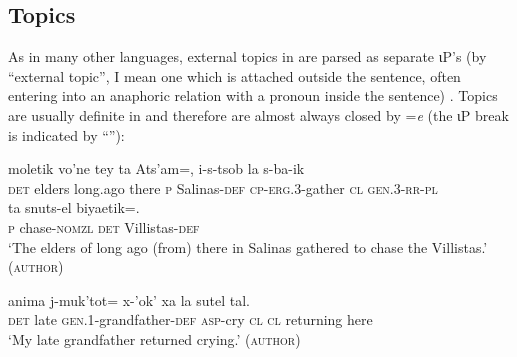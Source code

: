 \documentclass[output=paper,
modfonts
]{LSP/langsci}
\begin{document}
\subsection{Topics}
As in many other languages, external topics in  are parsed as separate ιP's  (by ``external topic'', I mean one which is attached
outside the sentence, often entering into an anaphoric relation with a pronoun inside the sentence) \citep{aissen1992}.  
Topics are usually definite in  and therefore are almost always closed by =\emph{e}
(the ιP break is indicated by ``\textbardbl''):
\begin{exe}
\ex\label{exe:top4}\bridgeoverex
\gll {} moletik vo'ne tey ta Ats'am=,  \textbardbl {}  i-s-tsob la s-ba-ik \\
\textsc{det} elders  long.ago there \textsc{p} Salinas-\textsc{def} {} \textsc{cp-erg.3}-gather \textsc{cl} \textsc{gen.3-rr-pl} \\
\glt { }{\vspace*{3ex}}
\gll ta snuts-el    biyaetik=.  \\
 \textsc{p} chase-\textsc{nomzl}  \textsc{det} Villistas-\textsc{def} \\
\glt `The elders of long ago (from) there in Salinas gathered to chase the Villistas.' (\textsc{author})
\end{exe}%
\begin{exe}
\ex\label{exe:top3}\bridgeoverex
\gll {} anima j-muk'tot=  \textbardbl {} x-'ok' xa la sutel tal. \\
\textsc{det} late \textsc{gen.1}-grandfather-\textsc{def} {} \textsc{asp}-cry \textsc{cl} \textsc{cl} returning here \\
\glt `My late grandfather returned crying.' (\textsc{author})
\end{exe}
\end{document}
